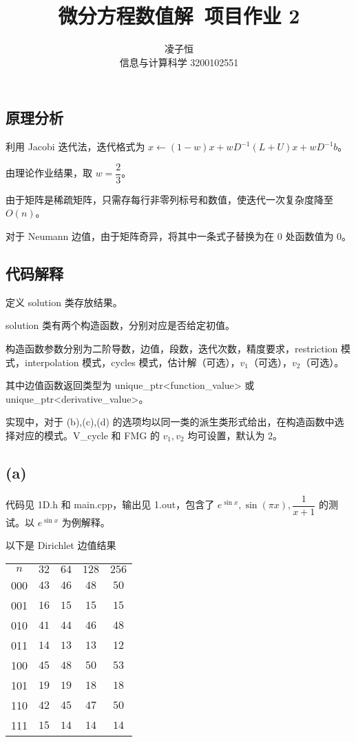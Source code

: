 \documentclass[12pt]{ctexart}
\title{微分方程数值解~项目作业 2}
\author{凌子恒 \\ 信息与计算科学 3200102551}
\begin{document}
\maketitle

\subsection*{原理分析}

利用 Jacobi 迭代法，迭代格式为 $x\gets (1-w)x+wD^{-1}(L+U)x+wD^{-1}b$。

由理论作业结果，取 $w=\dfrac{2}{3}$。

由于矩阵是稀疏矩阵，只需存每行非零列标号和数值，使迭代一次复杂度降至 $O(n)$。

对于 Neumann 边值，由于矩阵奇异，将其中一条式子替换为在 $0$ 处函数值为 $0$。

\subsection*{代码解释}

定义 solution 类存放结果。

solution 类有两个构造函数，分别对应是否给定初值。

构造函数参数分别为二阶导数，边值，段数，迭代次数，精度要求，restriction 模式，interpolation 模式，cycles 模式，估计解（可选），$v_1$（可选），$v_2$（可选）。

其中边值函数返回类型为 unique\_ptr<function\_value> 或 unique\_ptr<derivative\_value>。

实现中，对于 (b),(c),(d) 的选项均以同一类的派生类形式给出，在构造函数中选择对应的模式。V\_cycle 和 FMG 的 $v_1,v_2$ 均可设置，默认为 $2$。

\subsection*{(a)}

代码见 1D.h 和 main.cpp，输出见 1.out，包含了 $e^{\sin x},\sin(\pi x),\dfrac{1}{x+1}$ 的测试。以 $e^{\sin x}$ 为例解释。

以下是 Dirichlet 边值结果

\begin{tabular}{c|c|c|c|c}
 $n$  &$32 $&$64$ &$128$&$ 256$\\
000 &$43 $&$46$ &$48 $&$50$\\
001 &$16 $&$15$ &$15 $&$15$\\
010 &$41 $&$44$ &$46 $&$48$\\
011 &$14 $&$13$ &$13 $&$12$\\
100 &$45 $&$48$ &$50 $&$53$\\
101 &$19 $&$19$ &$18 $&$18$\\
110 &$42 $&$45$ &$47 $&$50$\\
111 &$15 $&$14$ &$14 $&$14$\\
\end{tabular}
\end{document}
